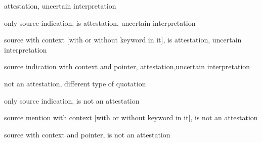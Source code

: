 \documentclass[10pt]{article}
\let\tempeone\enumerate
\let\tempetwo\endenumerate
\renewenvironment{enumerate}{\tempeone\setlength\itemsep{-0.5pt}\setlength{\partopsep}{-0.5pt}\setlength{\parsep}{-0.5pt}\setlength{\topsep}{-0.5pt}}{\tempetwo}
\begin{document}
{\begin{enumerate}
\begin{enumerate}
\end{enumerate}
	\item {\fontsize{10pt}{12.0pt}\selectfont attestation, uncertain interpretation\par}\par

\begin{enumerate}
	\item {\fontsize{10pt}{12.0pt}\selectfont only source indication, is attestation, uncertain interpretation\par}\par

	\item {\fontsize{10pt}{12.0pt}\selectfont source with context [with or without keyword in it], is attestation, uncertain interpretation\par}\par

	\item {\fontsize{10pt}{12.0pt}\selectfont source indication with context and pointer, attestation,uncertain interpretation\par}\par


\end{enumerate}
	\item {\fontsize{10pt}{12.0pt}\selectfont not an attestation, different type of quotation\par}\par

\begin{enumerate}
	\item {\fontsize{10pt}{12.0pt}\selectfont only source indication, is not an attestation\par}\par

	\item {\fontsize{10pt}{12.0pt}\selectfont source mention with context [with or without keyword in it], is not an attestation\par}\par

	\item {\fontsize{10pt}{12.0pt}\selectfont [theoretically] source with context and pointer, is not an attestation\par}
\end{enumerate}
\end{enumerate}
}
\end{document}
